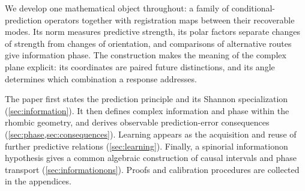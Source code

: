 We develop one mathematical object throughout: a family of conditional-prediction operators together with registration maps between their recoverable modes. Its norm measures predictive strength, its polar factors separate changes of strength from changes of orientation, and comparisons of alternative routes give information phase. The construction makes the meaning of the complex plane explicit: its coordinates are paired future distinctions, and its angle determines which combination a response addresses.

The paper first states the prediction principle and its Shannon specialization (\cref{sec:information}). It then defines complex information and phase within the rhombic geometry, and derives observable prediction-error consequences (\cref{sec:phase,sec:consequences}). Learning appears as the acquisition and reuse of further predictive relations (\cref{sec:learning}). Finally, a spinorial informationon hypothesis gives a common algebraic construction of causal intervals and phase transport (\cref{sec:informationons}). Proofs and calibration procedures are collected in the appendices.


